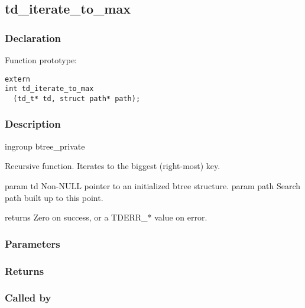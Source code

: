
\newpage
\subsection{td\_iterate\_to\_max}
\subsubsection{Declaration} Function prototype:

\begin{verbatim}
extern
int td_iterate_to_max
  (td_t* td, struct path* path);
\end{verbatim}

\subsubsection{Description}

 
 ingroup btree\_private 

 Recursive function.
 Iterates to the biggest (right-most) key.

 param td Non-NULL pointer to an initialized btree structure.
 param path Search path built up to this point.

 returns Zero on success, or a TDERR\_* value on error.
 

\subsubsection{Parameters}
\subsubsection{Returns}
\subsubsection{Called by}
